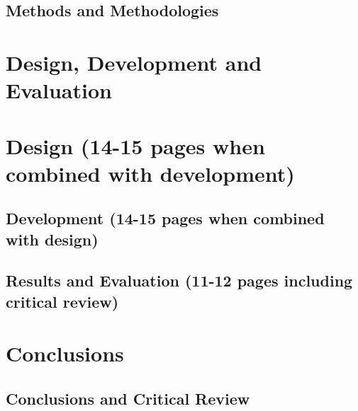 \documentclass[10pt]{article}
\begin{document}
\subsection{Methods and Methodologies}

\section {Design, Development and Evaluation}

\section{Design (14-15 pages when combined with development)}

\subsection {Development (14-15 pages when combined with design)}

\subsection {Results and Evaluation (11-12 pages including critical review)}

\section {Conclusions}

\subsection {Conclusions and Critical Review}

\printbibliography
\end{document}
